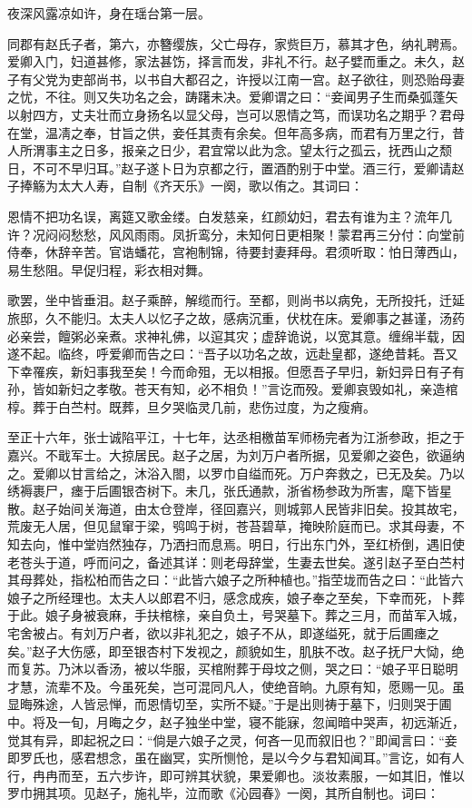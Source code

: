 \documentclass[a4paper,12pt,UTF8,twoside]{ctexbook}
\begin{document}
夜深风露凉如许，身在瑶台第一层。

同郡有赵氏子者，第六，亦簪缨族，父亡母存，家赀巨万，慕其才色，纳礼聘焉。爱卿入门，妇道甚修，家法甚饬，择言而发，非礼不行。赵子嬖而重之。未久，赵子有父党为吏部尚书，以书自大都召之，许授以江南一宫。赵子欲往，则恐贻母妻之忧，不往。则又失功名之会，踌躇未决。爱卿谓之曰：“妾闻男子生而桑弧蓬矢以射四方，丈夫壮而立身扬名以显父母，岂可以恩情之笃，而误功名之期乎？君母在堂，温凊之奉，甘旨之供，妾任其责有余矣。但年高多病，而君有万里之行，昔人所渭事主之日多，报亲之日少，君宜常以此为念。望太行之孤云，抚西山之颓日，不可不早归耳。”赵子遂卜日为京都之行，置酒酌别于中堂。酒三行，爱卿请赵子捧觞为太大人寿，自制《齐天乐》一阕，歌以侑之。其词曰：

恩情不把功名误，离筵又歌金缕。白发慈亲，红颜幼妇，君去有谁为主？流年几许？况闷闷愁愁，风风雨雨。凤折鸾分，未知何日更相聚！蒙君再三分付：向堂前侍奉，休辞辛苦。官诰蟠花，宫袍制锦，待要封妻拜母。君须听取：怕日薄西山，易生愁阻。早促归程，彩衣相对舞。

歌罢，坐中皆垂泪。赵子乘醉，解缆而行。至都，则尚书以病免，无所投托，迁延旅邸，久不能归。太夫人以忆子之故，感病沉重，伏枕在床。爱卿事之甚谨，汤药必亲尝，饘粥必亲煮。求神礼佛，以逭其灾；虚辞诡说，以宽其意。缠绵半载，因遂不起。临终，呼爱卿而告之曰：“吾子以功名之故，远赴皇都，遂绝昔耗。吾又下幸罹疾，新妇事我至矣！今而命殂，无以相报。但愿吾子早归，新妇异日有子有孙，皆如新妇之孝敬。苍天有知，必不相负！”言讫而殁。爱卿哀毁如礼，亲造棺椁。葬于白苎村。既葬，旦夕哭临灵几前，悲伤过度，为之瘦痟。

至正十六年，张士诚陷平江，十七年，达丞相檄苗军师杨完者为江浙参政，拒之于嘉兴。不戢军士。大掠居民。赵子之居，为刘万户者所据，见爱卿之姿色，欲逼纳之。爱卿以甘言给之，沐浴入閤，以罗巾自缢而死。万户奔救之，已无及矣。乃以绣褥裹尸，瘗于后圃银杏树下。未几，张氏通款，浙省杨参政为所害，麾下皆星散。赵子始间关海道，由太仓登岸，径回嘉兴，则城郭人民皆非旧矣。投其故宅，荒废无人居，但见鼠窜于梁，鸮鸣于树，苍苔碧草，掩映阶庭而已。求其母妻，不知去向，惟中堂岿然独存，乃洒扫而息焉。明日，行出东门外，至红桥倒，遇旧使老苍头于道，呼而问之，备述其详：则老母辞堂，生妻去世矣。遂引赵子至白苎村其母葬处，指松柏而告之曰：“此皆六娘子之所种植也。”指茔垅而告之曰：“此皆六娘子之所经理也。太夫人以郎君不归，感念成疾，娘子奉之至矣，下幸而死，卜葬于此。娘子身被衰麻，手扶棺榇，亲自负土，号哭墓下。葬之三月，而苗军入城，宅舍被占。有刘万户者，欲以非礼犯之，娘子不从，即遂缢死，就于后圃瘗之矣。”赵子大伤感，即至银杏村下发视之，颜貌如生，肌肤不改。赵子抚尸大恸，绝而复苏。乃沐以香汤，被以华服，买棺附葬于母坟之侧，哭之曰：“娘子平日聪明才慧，流辈不及。今虽死矣，岂可混同凡人，使绝音晌。九原有知，愿赐一见。虽显晦殊途，人皆忌惮，而恩情切至，实所不疑。”于是出则祷于墓下，归则哭于圃中。将及一旬，月晦之夕，赵子独坐中堂，寝不能寐，忽闻暗中哭声，初远渐近，觉其有异，即起祝之曰：“倘是六娘子之灵，何吝一见而叙旧也？”即闻言曰：“妾即罗氏也，感君想念，虽在幽冥，实所恻怆，是以今夕与君知闻耳。”言讫，如有人行，冉冉而至，五六步许，即可辨其状貌，果爱卿也。淡妆素服，一如其旧，惟以罗巾拥其项。见赵子，施礼毕，泣而歌《沁园春》一阕，其所自制也。词曰：
\end{document}
